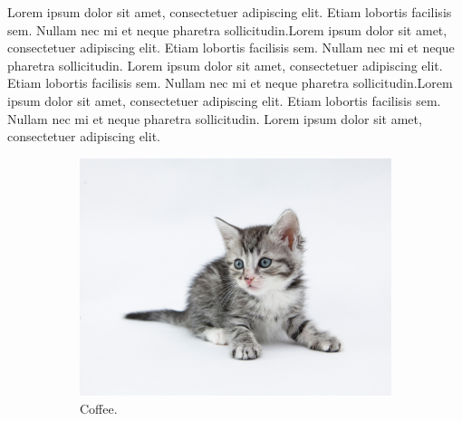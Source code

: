 \documentclass[12pt]{article}
\begin{document}
\newpage


Lorem ipsum dolor sit amet, consectetuer adipiscing elit. 
Etiam lobortis facilisis sem. Nullam nec mi et neque pharetra sollicitudin.Lorem ipsum dolor sit amet, consectetuer adipiscing elit. Etiam lobortis facilisis sem. Nullam nec mi et neque pharetra sollicitudin. Lorem ipsum dolor sit amet, consectetuer adipiscing elit. 
Etiam lobortis facilisis sem. Nullam nec mi et neque pharetra sollicitudin.Lorem ipsum dolor sit amet, consectetuer adipiscing elit. Etiam lobortis facilisis sem. Nullam nec mi et neque pharetra sollicitudin. Lorem ipsum dolor sit amet, consectetuer adipiscing elit. 



\begin{figure}[t!]
  \centering
  \begin{subfigure}[b]{0.3\linewidth}
    \includegraphics[width=\linewidth]{./kitten2.jpg}
     \caption{Coffee.}
  \end{subfigure}
  \begin{subfigure}[b]{0.3\linewidth}

\end{subfigure}
\end{figure}
\end{document}
